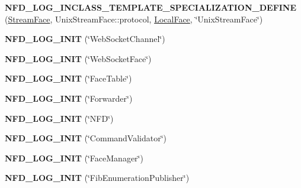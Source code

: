 \begin{DoxyCompactItemize}
\item 
{\bfseries N\+F\+D\+\_\+\+L\+O\+G\+\_\+\+I\+N\+C\+L\+A\+S\+S\+\_\+T\+E\+M\+P\+L\+A\+T\+E\+\_\+\+S\+P\+E\+C\+I\+A\+L\+I\+Z\+A\+T\+I\+O\+N\+\_\+\+D\+E\+F\+I\+NE} (\hyperlink{classnfd_1_1StreamFace}{Stream\+Face}, Unix\+Stream\+Face\+::protocol, \hyperlink{classnfd_1_1LocalFace}{Local\+Face}, \char`\"{}Unix\+Stream\+Face\char`\"{})\hypertarget{namespacenfd_a442d4dfb2a783db74f1fad3a37b31ed3}{}\label{namespacenfd_a442d4dfb2a783db74f1fad3a37b31ed3}

\item 
{\bfseries N\+F\+D\+\_\+\+L\+O\+G\+\_\+\+I\+N\+IT} (\char`\"{}Web\+Socket\+Channel\char`\"{})\hypertarget{namespacenfd_af5ab5ca287da36b1fea735f6c577524e}{}\label{namespacenfd_af5ab5ca287da36b1fea735f6c577524e}

\item 
{\bfseries N\+F\+D\+\_\+\+L\+O\+G\+\_\+\+I\+N\+IT} (\char`\"{}Web\+Socket\+Face\char`\"{})\hypertarget{namespacenfd_ae1e42ff4ed5b8cf34debc04a2dacb00e}{}\label{namespacenfd_ae1e42ff4ed5b8cf34debc04a2dacb00e}

\item 
{\bfseries N\+F\+D\+\_\+\+L\+O\+G\+\_\+\+I\+N\+IT} (\char`\"{}Face\+Table\char`\"{})\hypertarget{namespacenfd_a7ef1b0625f370a6285daa65d9d17c66a}{}\label{namespacenfd_a7ef1b0625f370a6285daa65d9d17c66a}

\item 
{\bfseries N\+F\+D\+\_\+\+L\+O\+G\+\_\+\+I\+N\+IT} (\char`\"{}Forwarder\char`\"{})\hypertarget{namespacenfd_aa00e503356975748946be67f18487a37}{}\label{namespacenfd_aa00e503356975748946be67f18487a37}

\item 
{\bfseries N\+F\+D\+\_\+\+L\+O\+G\+\_\+\+I\+N\+IT} (\char`\"{}N\+FD\char`\"{})\hypertarget{namespacenfd_a00fe5aea2449270f930b6464bfed799b}{}\label{namespacenfd_a00fe5aea2449270f930b6464bfed799b}

\item 
{\bfseries N\+F\+D\+\_\+\+L\+O\+G\+\_\+\+I\+N\+IT} (\char`\"{}Command\+Validator\char`\"{})\hypertarget{namespacenfd_ac84df1b06167f3ab3c4c2f47a5cc227a}{}\label{namespacenfd_ac84df1b06167f3ab3c4c2f47a5cc227a}

\item 
{\bfseries N\+F\+D\+\_\+\+L\+O\+G\+\_\+\+I\+N\+IT} (\char`\"{}Face\+Manager\char`\"{})\hypertarget{namespacenfd_a5ee1db7830af9435a11a9dc1e464f615}{}\label{namespacenfd_a5ee1db7830af9435a11a9dc1e464f615}

\item 
{\bfseries N\+F\+D\+\_\+\+L\+O\+G\+\_\+\+I\+N\+IT} (\char`\"{}Fib\+Enumeration\+Publisher\char`\"{})\hypertarget{namespacenfd_af39a52d9458e90e5f0bb6512c622a1a5}{}\label{namespacenfd_af39a52d9458e90e5f0bb6512c622a1a5}


\end{DoxyCompactItemize}

